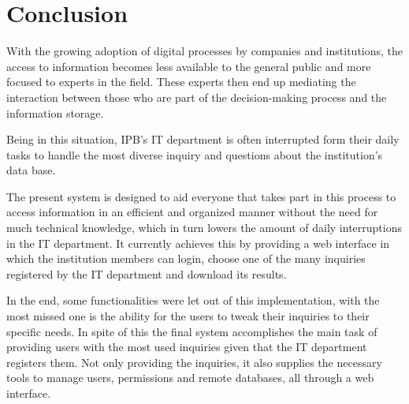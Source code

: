 \chapter{Conclusion}\label{conclusion}

With the growing adoption of digital processes by companies and institutions, the access to information becomes less available to the general public and more focused to experts in the field. These experts then end up mediating the interaction between those who are part of the decision-making process and the information storage.

Being in this situation, \gls{IPB}'s \gls{IT} department is often interrupted form their daily tasks to handle the most diverse inquiry and questions about the institution's data base.

The present system is designed to aid everyone that takes part in this process to access information in an efficient and organized manner without the need for much technical knowledge, which in turn lowers the amount of daily interruptions in the \gls{IT} department.
It currently achieves this by providing a web interface in which the institution members can login, choose one of the many inquiries registered by the \gls{IT} department and download its results.

In the end, some functionalities were let out of this implementation, with the most missed one is the ability for the users to tweak their inquiries to their specific needs.
In spite of this the final system accomplishes the main task of providing users with the most used inquiries given that the \gls{IT} department registers them. Not only providing the inquiries, it also supplies the necessary tools to manage users, permissions and remote databases, all through a web interface.